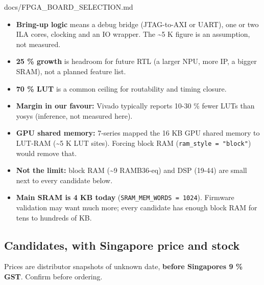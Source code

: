 \begin{relocated}{docs/FPGA_BOARD_SELECTION.md}
\begin{itemize}
\tightlist
\item
  \textbf{Bring-up logic} means a debug bridge (JTAG-to-AXI or UART),
  one or two ILA cores, clocking and an IO wrapper. The \textasciitilde5
  K figure is an assumption, not measured.
\item
  \textbf{25 \% growth} is headroom for future RTL (a larger NPU, more
  IP, a bigger SRAM), not a planned feature list.
\item
  \textbf{70 \% LUT} is a common ceiling for routability and timing
  closure.
\item
  \textbf{Margin in our favour:} Vivado typically reports 10-30 \% fewer
  LUTs than yosys (inference, not measured here).
\item
  \textbf{GPU shared memory:} 7-series mapped the 16 KB GPU shared
  memory to LUT-RAM (\textasciitilde5 K LUT sites). Forcing block RAM
  (\texttt{ram\_\allowbreak{}style\ =\allowbreak{}\ "block"}) would
  remove that.
\item
  \textbf{Not the limit:} block RAM (\textasciitilde9 RAMB36-eq) and DSP
  (19-44) are small next to every candidate below.
\item
  \textbf{Main SRAM is 4 KB today}
  (\texttt{SRAM\_\allowbreak{}MEM\_\allowbreak{}WORDS\ =\allowbreak{}\ 1024}).
  Firmware validation may want much more; every candidate has enough
  block RAM for tens to hundreds of KB.
\end{itemize}

\subsection{Candidates, with Singapore price and stock}\label{tm:dec:fpga-board-selection:2-candidates-with-singapore-price-and-stock}

Prices are distributor snapshots of unknown date, \textbf{before
Singapore\textquotesingle s 9 \% GST}. Confirm before ordering.

{\footnotesize\setlength{\tabcolsep}{3pt}

}
\end{relocated}
